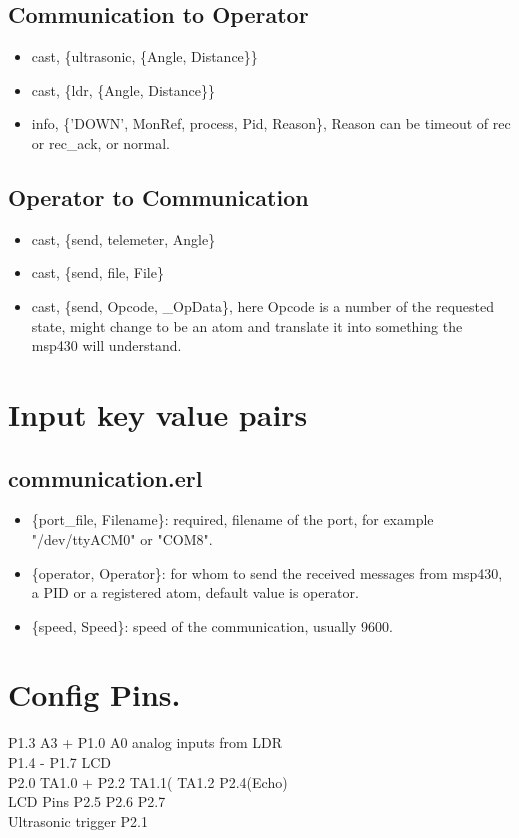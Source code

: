 \documentclass{article}
\begin{document}
\subsection{Communication to Operator}
\begin{itemize}
    \item cast, \{ultrasonic, \{Angle, Distance\}\}
    \item cast, \{ldr, \{Angle, Distance\}\}
    \item info, \{'DOWN', MonRef, process, Pid, Reason\}, Reason can be timeout of rec or rec\_ack, or normal.
\end{itemize}

\subsection{Operator to Communication}
\begin{itemize}
    \item cast, \{send, telemeter, Angle\}
    \item cast, \{send, file, File\}
    \item cast, \{send, Opcode, \_OpData\}, here Opcode is a number of the requested state, might change to be an atom and translate it into something the msp430 will understand.
\end{itemize}

\section{Input key value pairs}
\subsection{communication.erl}
\begin{itemize}
    \item \{port\_file, Filename\}: required, filename of the port, for example "/dev/ttyACM0" or "COM8".
    \item \{operator, Operator\}: for whom to send the received messages from msp430, a PID or a registered atom, default value is operator.
    \item \{speed, Speed\}: speed of the communication, usually 9600.
\end{itemize}
\section{Config Pins.}
P1.3 A3 + P1.0 A0 analog inputs from LDR\\
P1.4 - P1.7 LCD \\
P2.0 TA1.0 + P2.2 TA1.1( TA1.2 P2.4(Echo)\\
LCD Pins P2.5 P2.6 P2.7\\
Ultrasonic trigger P2.1\\
\\
\end{document}
